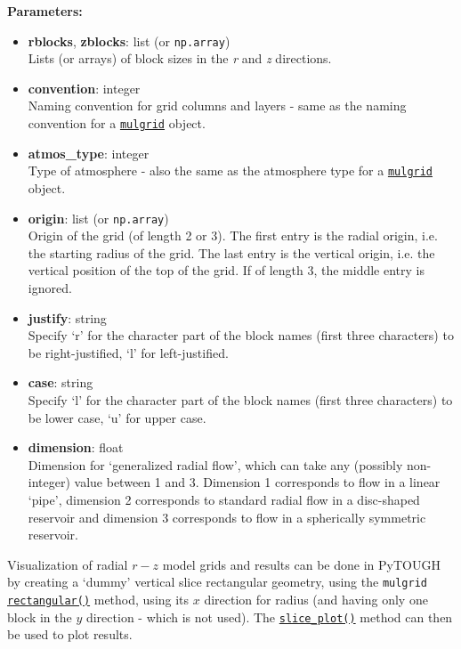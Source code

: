 \textbf{Parameters:}
\begin{itemize}
\item \textbf{rblocks}, \textbf{zblocks}: list (or \texttt{np.array})\\
  Lists (or arrays) of block sizes in the \emph{r} and \emph{z} directions.
\item \textbf{convention}: integer\\
  Naming convention for grid columns and layers - same as the naming convention for a \hyperref[mulgrids]{\texttt{mulgrid}} object.
\item \textbf{atmos\_type}: integer\\
  Type of atmosphere - also the same as the atmosphere type for a \hyperref[mulgrids]{\texttt{mulgrid}} object.
\item \textbf{origin}: list (or \texttt{np.array})\\
  Origin of the grid (of length 2 or 3).  The first entry is the radial origin, i.e. the starting radius of the grid.  The last entry is the vertical origin, i.e. the vertical position of the top of the grid.  If of length 3, the middle entry is ignored.
\item \textbf{justify}: string\\
  Specify `r' for the character part of the block names (first three characters) to be right-justified, `l' for left-justified.
\item \textbf{case}: string\\
  Specify `l' for the character part of the block names (first three characters) to be lower case, `u' for upper case.
\item \textbf{dimension}: float\\
  Dimension for `generalized radial flow', which can take any (possibly non-integer) value between 1 and 3.  Dimension 1 corresponds to flow in a linear `pipe', dimension 2 corresponds to standard radial flow in a disc-shaped reservoir and dimension 3 corresponds to flow in a spherically symmetric reservoir.
\end{itemize}

Visualization of radial $r-z$ model grids and results can be done in PyTOUGH by creating a `dummy' vertical slice rectangular geometry, using the \texttt{mulgrid} \hyperref[sec:mulgrid:rectangular]{\texttt{rectangular()}} method, using its $x$ direction for radius (and having only one block in the $y$ direction - which is not used).  The \hyperref[sec:mulgrid:slice_plot]{\texttt{slice\_plot()}} method can then be used to plot results.

